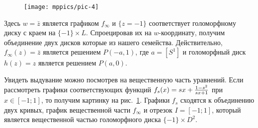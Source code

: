 \begin{figure}[th!]
\vskip-0mm
\centering
\texttt{[image: mppics/pic-4]}
\caption{}\label{pic-4}
\vskip0mm
\end{figure}

Здесь $w = \bar z$ является графиком $f_\infty$ и $\{z = -1\}$ соответствует голоморфному диску с краем на $\{-1\} \times L$.
Спроецировав их на $w$-координату, получим объединение двух дисков
которые  из нашего семейства.
Действительно, $f_\infty (z) = \bar z$ является решением $P (-a, 1)$, где $a = [S^1]$ и голоморфный диск $h (z) = z$ является решением $P (a, 0)$.


Увидеть выдувание можно посмотрев на вещественную часть уравнений.
Если рассмотреть графики соответствующих функций
$f_s(x)\z=sx+\frac{1-s^2}{sx+1}$ при $x \in [-1;1]$, 
то получим картинку на рис.~\ref{pic-4}. 
Графики $f_s$ сходятся к объединению двух кривых, график вещественной
части $f_\infty$ и отрезок $I = [-1;1]$, который является
вещественной частью голоморфного диска $\{-1\} \times D^2$.  
